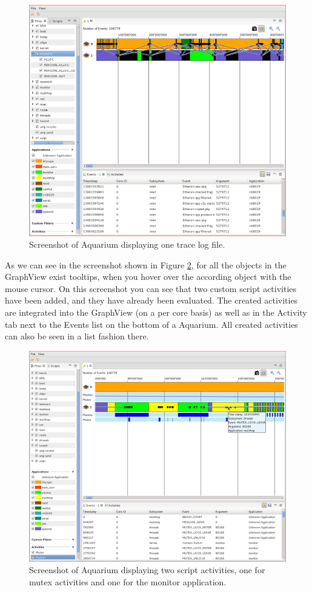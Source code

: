 \documentclass[a4paper,11pt,twoside]{report}
\begin{document}
\begin{figure}[htb]
	\includegraphics[width=1\textwidth]{images/aquarium.png}
	\caption{Screenshot of Aquarium displaying one trace log file.}
	\label{fig:aquarium}
\end{figure}

As we can see in the screenshot shown in Figure \ref{fig:aquarium-activities},
for all the objects in the GraphView exist tooltips, when you hover over the
according object with the mouse cursor. On this screenshot you can see that two
custom script activities have been added, and they have already been evaluated.
The created activities are integrated into the GraphView (on a per core basis)
as well as in the Activity tab next to the Events list on the bottom of a
Aquarium. All created activities can also be seen in a list fashion there.

\begin{figure}[htb]
	\includegraphics[width=1\textwidth]{images/aquarium-activities.png}
	\caption{Screenshot of Aquarium displaying two script activities, one for
	mutex activities and one for the monitor application.}
	\label{fig:aquarium-activities}
\end{figure}
\end{document}
